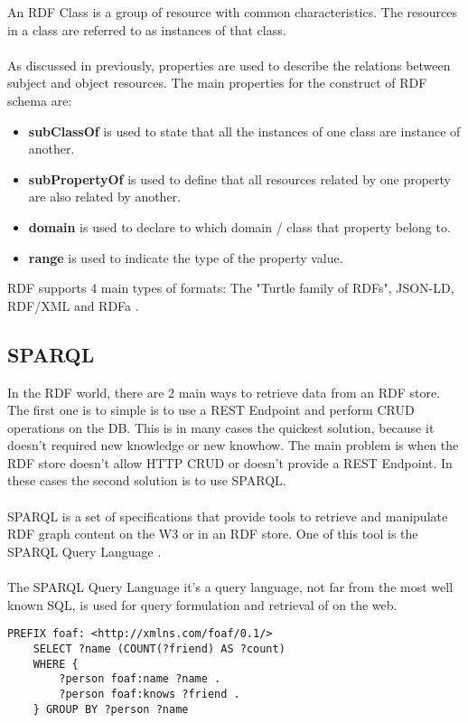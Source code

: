 An RDF Class is a group of resource with common characteristics. The resources in a class are referred to as instances of that class.
\\
\\
As discussed in previously, properties are used to describe the relations between subject and object resources.
The main properties for the construct of RDF schema are: 
\begin{itemize}
	\item \textbf{subClassOf} is used to state that all the instances of one class are instance of another.
	\item \textbf{subPropertyOf} is used to define that all resources related by one property are also related by another.
	\item \textbf{domain} is used to declare to which domain / class that property belong to.
	\item \textbf{range} is used to indicate the type of the property value.
\end{itemize}

RDF supports 4 main types of formats: The "Turtle family of RDFs", JSON-LD, RDF/XML and RDFa \cite{rdf}.



\subsection{SPARQL \label{sec:bbb}}
In the RDF world, there are 2 main ways to retrieve data from an RDF store. The first one is to simple is to use a REST Endpoint and perform CRUD operations on the DB. This is in many cases the quickest solution, because it doesn't required new knowledge or new knowhow. 
The main problem is when the RDF store doesn't allow HTTP CRUD or doesn't provide a REST Endpoint.
In these cases the second solution is to use SPARQL.
\\
\\
SPARQL is a set of specifications that provide tools to retrieve and manipulate RDF graph content on the W3 or in an RDF store.
One of this tool is the SPARQL Query Language \cite{sparql}.
\\
\\
The SPARQL Query Language it's a query language, not far from the most well known SQL, is used for query formulation and retrieval of on the web.
\begin{lstlisting}[language=SPARQL, caption={Example of SPARQL Query}, basicstyle=\ttfamily, frame=single]
    PREFIX foaf: <http://xmlns.com/foaf/0.1/>
    SELECT ?name (COUNT(?friend) AS ?count)
    WHERE { 
        ?person foaf:name ?name . 
        ?person foaf:knows ?friend . 
    } GROUP BY ?person ?name
\end{lstlisting}
    

